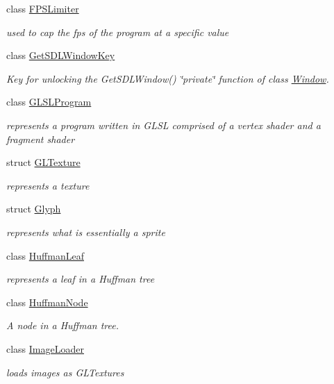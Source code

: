 \begin{DoxyCompactItemize}
class \hyperlink{classnta_1_1FPSLimiter}{F\+P\+S\+Limiter}
\begin{DoxyCompactList}\small\item\em used to cap the fps of the program at a specific value \end{DoxyCompactList}\item 
class \hyperlink{classnta_1_1GetSDLWindowKey}{Get\+S\+D\+L\+Window\+Key}
\begin{DoxyCompactList}\small\item\em Key for unlocking the Get\+S\+D\+L\+Window() \char`\"{}private\char`\"{} function of class \hyperlink{classnta_1_1Window}{Window}. \end{DoxyCompactList}\item 
class \hyperlink{classnta_1_1GLSLProgram}{G\+L\+S\+L\+Program}
\begin{DoxyCompactList}\small\item\em represents a program written in G\+L\+SL comprised of a vertex shader and a fragment shader \end{DoxyCompactList}\item 
struct \hyperlink{structnta_1_1GLTexture}{G\+L\+Texture}
\begin{DoxyCompactList}\small\item\em represents a texture \end{DoxyCompactList}\item 
struct \hyperlink{structnta_1_1Glyph}{Glyph}
\begin{DoxyCompactList}\small\item\em represents what is essentially a sprite \end{DoxyCompactList}\item 
class \hyperlink{classnta_1_1HuffmanLeaf}{Huffman\+Leaf}
\begin{DoxyCompactList}\small\item\em represents a leaf in a Huffman tree \end{DoxyCompactList}\item 
class \hyperlink{classnta_1_1HuffmanNode}{Huffman\+Node}
\begin{DoxyCompactList}\small\item\em A node in a Huffman tree. \end{DoxyCompactList}\item 
class \hyperlink{classnta_1_1ImageLoader}{Image\+Loader}
\begin{DoxyCompactList}\small\item\em loads images as G\+L\+Textures \end{DoxyCompactList}\item 

\end{DoxyCompactItemize}
